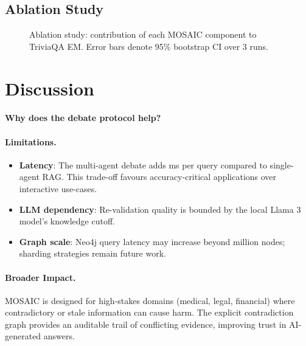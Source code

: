 \documentclass{article}
\begin{document}
\subsection{Ablation Study}

\begin{figure}[ht]
  \centering
  \caption{Ablation study: contribution of each MOSAIC component to TriviaQA EM.
    Error bars denote 95\% bootstrap CI over 3 runs.}
  \label{fig:ablation}
\end{figure}



\section{Discussion}
\label{sec:discussion}

\paragraph{Why does the debate protocol help?}

\paragraph{Limitations.}
\begin{itemize}
  \item \textbf{Latency}: The multi-agent debate adds  ms per query
    compared to single-agent RAG.  This trade-off favours accuracy-critical
    applications over interactive use-cases.
  \item \textbf{LLM dependency}: Re-validation quality is bounded by the local
    Llama 3 model's knowledge cutoff.
  \item \textbf{Graph scale}: Neo4j query latency may increase beyond
     million nodes; sharding strategies remain future work.
\end{itemize}

\paragraph{Broader Impact.}
MOSAIC is designed for high-stakes domains (medical, legal, financial) where
contradictory or stale information can cause harm.  The explicit contradiction
graph provides an auditable trail of conflicting evidence, improving trust in
AI-generated answers.
\end{document}
